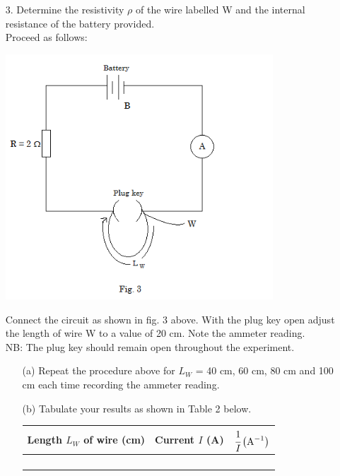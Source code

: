 \begin{enumerate}
\begin{enumerate}
\end{enumerate}

\item[3.] Determine the resistivity $\rho$ of the wire labelled W and the internal resistance of the battery provided.\\

Proceed as follows:

\begin{center}
\includegraphics[width=10cm]{./img/2004-3-alt.png}
\end{center}

Connect the circuit as shown in fig. 3 above. With the plug key open adjust the length of wire W to a value of 20 cm. Note the ammeter reading.\\[10pt]

\noindent NB: The plug key should remain open throughout the experiment.

\begin{enumerate}
\item[(a)] Repeat the procedure above for $L_W$ = 40 cm, 60 cm, 80 cm and 100 cm each time recording the ammeter reading.
\item[(b)] Tabulate your results as shown in Table 2 below.

\begin{tabular}{|p{2.5cm}|c|c|} \hline
Length $L_W$ of wire (cm)& Current $I$ (A)& $\cfrac{1}{I} \left(\text{A}^{-1}\right)$ \\ \hline
&& \\
&& \\
&& \\
&& \\ \hline
\end{tabular}\\[10pt]


\end{enumerate}
\end{enumerate}
